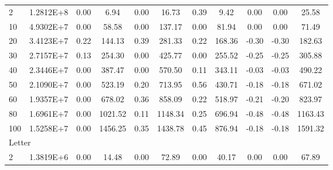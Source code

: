 {\begin{longtable}{@{}llccccccccc@{}}
\multicolumn{1}{l|}{2}   & \multicolumn{1}{l|}{1.2812E+8}  & 0.00 & \multicolumn{1}{c|}{6.94}    & 0.00 & \multicolumn{1}{c|}{16.73}   & 0.39 & \multicolumn{1}{c|}{9.42}    & 0.00      & 0.00      & 25.58   \\
\multicolumn{1}{l|}{10}  & \multicolumn{1}{l|}{4.9302E+7}  & 0.00 & \multicolumn{1}{c|}{58.58}   & 0.00 & \multicolumn{1}{c|}{137.17}  & 0.00 & \multicolumn{1}{c|}{81.94}   & 0.00      & 0.00      & 71.49   \\
\multicolumn{1}{l|}{20}  & \multicolumn{1}{l|}{3.4123E+7}  & 0.22 & \multicolumn{1}{c|}{144.13}  & 0.39 & \multicolumn{1}{c|}{281.33}  & 0.22 & \multicolumn{1}{c|}{168.36}  & -0.30     & -0.30     & 182.63  \\
\multicolumn{1}{l|}{30}  & \multicolumn{1}{l|}{2.7157E+7}  & 0.13 & \multicolumn{1}{c|}{254.30}  & 0.00 & \multicolumn{1}{c|}{425.77}  & 0.00 & \multicolumn{1}{c|}{255.52}  & -0.25     & -0.25     & 305.88  \\
\multicolumn{1}{l|}{40}  & \multicolumn{1}{l|}{2.3446E+7}  & 0.00 & \multicolumn{1}{c|}{387.47}  & 0.00 & \multicolumn{1}{c|}{570.50}  & 0.11 & \multicolumn{1}{c|}{343.11}  & -0.03     & -0.03     & 490.22  \\
\multicolumn{1}{l|}{50}  & \multicolumn{1}{l|}{2.1090E+7}  & 0.00 & \multicolumn{1}{c|}{523.19}  & 0.20 & \multicolumn{1}{c|}{713.95}  & 0.56 & \multicolumn{1}{c|}{430.71}  & -0.18     & -0.18     & 671.02  \\
\multicolumn{1}{l|}{60}  & \multicolumn{1}{l|}{1.9357E+7}  & 0.00 & \multicolumn{1}{c|}{678.02}  & 0.36 & \multicolumn{1}{c|}{858.09}  & 0.22 & \multicolumn{1}{c|}{518.97}  & -0.21     & -0.20     & 823.97  \\
\multicolumn{1}{l|}{80}  & \multicolumn{1}{l|}{1.6961E+7}  & 0.00 & \multicolumn{1}{c|}{1021.52} & 0.11 & \multicolumn{1}{c|}{1148.34} & 0.25 & \multicolumn{1}{c|}{696.94}  & -0.48     & -0.48     & 1163.43 \\
\multicolumn{1}{l|}{100} & \multicolumn{1}{l|}{1.5258E+7}  & 0.00 & \multicolumn{1}{c|}{1456.25} & 0.35 & \multicolumn{1}{c|}{1438.78} & 0.45 & \multicolumn{1}{c|}{876.94}  & -0.18     & -0.18     & 1591.32 \\ \hline
\multicolumn{11}{l}{Letter}                                                                                                                                                                                    \\ \hline
\multicolumn{1}{l|}{2}   & \multicolumn{1}{l|}{1.3819E+6}  & 0.00 & \multicolumn{1}{c|}{14.48}   & 0.00 & \multicolumn{1}{c|}{72.89}   & 0.00 & \multicolumn{1}{c|}{40.17}   & 0.00      & 0.00      & 67.89   \\

\end{longtable}}

